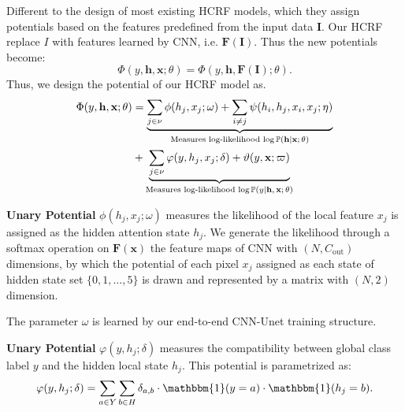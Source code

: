 \documentclass[conference]{IEEEtran}
\newcommand{\PP}{{\mathbb{P}}}
\newcommand{\Fb}{\mathbf{F}}
\newcommand{\Ib}{\mathbf{I}}
\newcommand{\hb}{\mathbf{h}}
\newcommand{\xb}{\mathbf{x}}
\newcommand{\one}{\mathbbm{1}}
\begin{document}
Different to the design of most existing HCRF models, which they assign
potentials based on the features predefined from the input data $\Ib$.
Our HCRF replace $I$ with features learned by CNN, i.e. $\Fb(\Ib)$. 
Thus the new potentials become:
\begin{equation*}
\Phi(y, \hb, \xb; \theta) = \Phi(y, \hb, \Fb(\Ib); \theta).
\end{equation*}
Thus, we design the potential of our HCRF model as.
\begin{equation}
\begin{split}
\Phi(y, \hb, \xb; \theta) &= \underbrace{
\sum_{j \in \nu} \phi(h_j, x_j; \omega)
+ \sum_{i \neq j} \psi(h_i, h_j, x_i, x_j; \eta)}_{
\textrm{Measures log-likelihood $\log\PP(\hb \vert \xb; \theta)$}} \\
&+ \underbrace{
\sum_{j \in \nu} \varphi(y, h_j, x_j; \delta) + \vartheta(y, \xb; \varpi)}_{
\textrm{Measures log-likelihood $\log\PP(y \vert \hb, \xb; \theta)$}}
\end{split}
\end{equation}


{\textbf{Unary Potential}}
$\phi(h_j, x_j; \omega)$ measures the likelihood of the local feature
$x_j$ is assigned as the hidden attention state $h_j$.
We generate the likelihood through a softmax operation on $\Fb(\xb)$
the feature maps of CNN with $(N, C_{\textrm{out}})$ dimensions,
by which the potential of each pixel $x_j$ assigned as each state of
hidden state set $\{0, 1, \dots, 5\}$ is drawn and represented by
a matrix with $(N, 2)$ dimension.


The parameter $\omega$ is learned by our end-to-end CNN-Unet training 
structure.


{\textbf{Unary Potential}}
$\varphi(y, h_j; \delta)$ measures the compatibility between global
class label $y$ and the hidden local state $h_j$. This potential is
parametrized as:
\begin{equation*}
\varphi(y, h_{j}; \delta) = \sum_{a \in Y} \sum_{b \in H} \delta_{a, b}
\cdot \one(y = a) \cdot \one(h_j = b).
\end{equation*}
\end{document}
